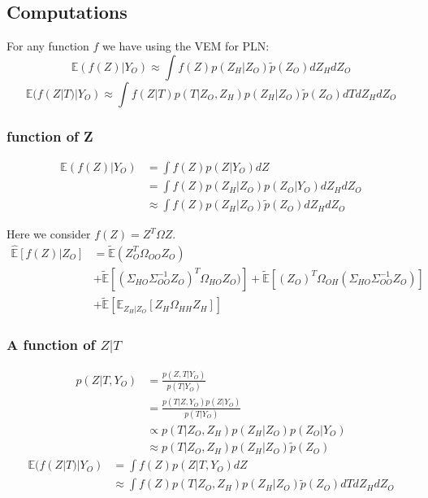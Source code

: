 \documentclass[11pt,a4paper]{article}
\newcommand{\Esp}{\mathds{E}}
\begin{document}
\subsection{Computations}

For any function $f$ we have using the VEM for PLN:
$$\Esp(f(Z)|Y_O)  \approx \int f(Z) p(Z_H|Z_O)\tilde{p}(Z_O) dZ_H dZ_O$$
$$\Esp(f(Z|T)|Y_O)  \approx \int f(Z|T) p(T|Z_O,Z_H) p(Z_H|Z_O)\tilde{p}(Z_O) dT dZ_H dZ_O$$
\subsubsection{ function of Z}
\begin{align*}
\Esp(f(Z)|Y_O) &=\int f(Z) p(Z|Y_O) dZ\\
&=\int f(Z) p(Z_H|Z_O) p(Z_O|Y_O) dZ_H dZ_O\\
&\approx \int f(Z) p(Z_H|Z_O)\tilde{p}(Z_O) dZ_H dZ_O
\end{align*}


 Here we consider $f(Z) = Z^T\Omega Z$.
\begin{align*}
\widehat{\Esp}[f(Z)|Z_O] &= \tilde{\Esp}(Z_O^T\Omega_{OO}Z_O)\\
& +\tilde{\Esp}\left[(\Sigma_{HO}\Sigma_{OO}^{-1} Z_O)^T \Omega_{HO}Z_O)\right] +\tilde{\Esp}\left[(Z_O)^T \Omega_{OH} (\Sigma_{HO}\Sigma_{OO}^{-1} Z_O)\right]\\
&+ \tilde{\Esp}\left[\Esp_{Z_H|Z_O} [Z_H\Omega_{HH}Z_H]\right]
\end{align*}


\subsubsection{A function of $Z|T$}
\begin{align*}
 p(Z|T,Y_O) &= \frac{p(Z,T|Y_O)}{p(T|Y_O)}\\
 &= \frac{p(T|Z,Y_O) p(Z|Y_O)}{p(T|Y_O)}\\
 & \propto p(T|Z_O,Z_H) p(Z_H|Z_O) p(Z_O|Y_O)\\
 &\approx  p(T|Z_O,Z_H) p(Z_H|Z_O)  \tilde{p}(Z_O) 
\end{align*}
\begin{align*}
\Esp(f(Z|T)|Y_O) &=\int f(Z) p(Z|T,Y_O) dZ\\
&\approx \int f(Z) p(T|Z_O,Z_H)p(Z_H|Z_O)\tilde{p}(Z_O) dT dZ_H dZ_O
\end{align*}
\end{document}
